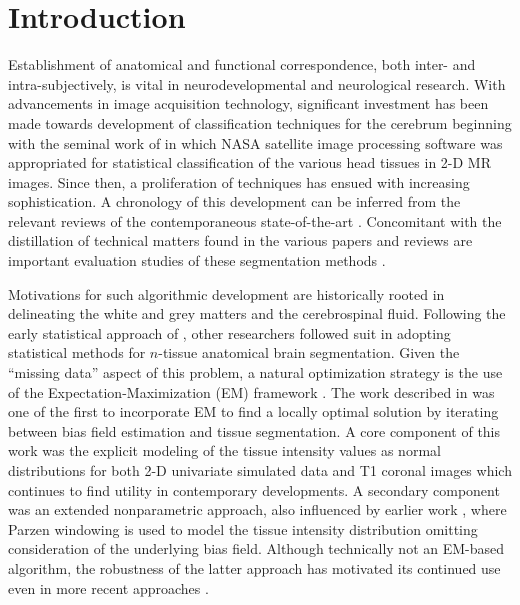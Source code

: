 \documentclass[11pt,english]{article}
\begin{document}
\clearpage

\section{Introduction}

Establishment of anatomical and functional correspondence, both inter- and intra-subjectively, is
vital in neurodevelopmental and neurological research.  With advancements in image acquisition
 technology, significant investment has been made towards development of
 classification techniques for the cerebrum beginning 
with the seminal work of \cite{Vannier1985} in which NASA satellite image processing software was 
appropriated for statistical classification of the various head tissues in 2-D MR images.  Since
then, a proliferation of techniques has ensued with increasing sophistication.  A chronology of 
this development can be inferred from the relevant reviews of the contemporaneous state-of-the-art
\citep{Bezdek1993,Pal1993,Clarke1995,Pham2000,Viergever2001,Suri2002,Duncan2004,Balafar2010}.
Concomitant with the distillation of technical matters found in the various papers and reviews are
 important evaluation studies of these segmentation methods \citep[e.g.][]{Cuadra2005,Zaidi2006,Klauschen2009,Boer2010}.
 
 
Motivations for such algorithmic development are historically rooted in delineating the white and grey matters and the cerebrospinal fluid.
Following the early statistical approach of \cite{Vannier1985},  other researchers followed 
suit in adopting statistical methods for $n$-tissue anatomical brain segmentation.
Given the ``missing data'' aspect of this problem, a natural optimization strategy is the 
use of the Expectation-Maximization (EM) framework \citep{Dempster1977}.  The work described in \cite{Wells1996} 
was one  of the first to incorporate EM to find a locally optimal solution by iterating between
bias field estimation and tissue segmentation.  A core component of this work was the 
explicit modeling of the tissue intensity values as normal distributions \citep{Cline1990} 
for both 2-D univariate simulated data and T1 coronal images which continues to find utility in contemporary developments.   A secondary component was an 
extended nonparametric approach, also influenced by earlier work \citep{Kikinis1992}, where 
Parzen windowing is used to model the tissue intensity distribution omitting consideration of the underlying bias
field.  Although technically not an EM-based algorithm, the robustness of the latter approach has motivated its continued use even in more recent approaches \citep[e.g.][]{Weisenfeld2009}.
\end{document}
